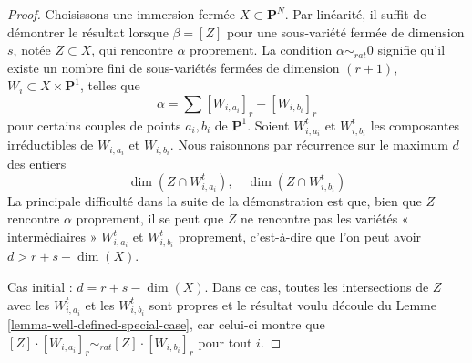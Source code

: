 \begin{proof}
Choisissons une immersion fermée $X \subset \mathbf{P}^N$.
Par linéarité, il suffit de démontrer le résultat lorsque $\beta = [Z]$ pour une
sous-variété fermée de dimension $s$, notée $Z \subset X$, qui rencontre $\alpha$
proprement. La condition $\alpha \sim_{rat} 0$ signifie qu'il
existe un nombre fini de sous-variétés fermées de dimension $(r + 1)$,
$W_i \subset X \times \mathbf{P}^1$, telles que
$$
\alpha = \sum [W_{i, a_i}]_r - [W_{i, b_i}]_r
$$
pour certains couples de points $a_i, b_i$ de $\mathbf{P}^1$.
Soient $W_{i, a_i}^t$ et $W_{i, b_i}^t$ les composantes irréductibles
de $W_{i, a_i}$ et $W_{i, b_i}$.
Nous raisonnons par récurrence sur le maximum $d$ des entiers
$$
\dim(Z \cap W_{i, a_i}^t),\quad \dim(Z \cap W_{i, b_i}^t)
$$
La principale difficulté dans la suite de la démonstration est que, bien que $Z$
rencontre $\alpha$ proprement, il se peut que $Z$ ne rencontre pas les
variétés « intermédiaires » $W_{i, a_i}^t$
et $W_{i, b_i}^t$ proprement, c'est-à-dire que l'on peut avoir $d >  r + s - \dim(X)$.

\medskip\noindent
Cas initial : $d = r + s - \dim(X)$. Dans ce cas, toutes les intersections de
$Z$ avec les $W_{i, a_i}^t$ et les $W_{i, b_i}^t$ sont propres et le
résultat voulu découle du Lemme \ref{lemma-well-defined-special-case},
car celui-ci montre que
$[Z] \cdot [W_{i, a_i}]_r \sim_{rat} [Z] \cdot [W_{i, b_i}]_r$ pour
tout $i$.


\end{proof}
